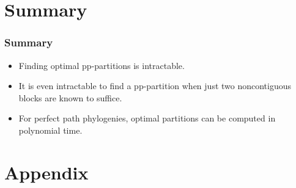 \documentclass{beamer}
\begin{document}
\section*{Summary}

\begin{frame}
  \frametitle<presentation>{Summary}

  \begin{itemize}
  \item
    Finding optimal pp-partitions is \alert{intractable}. 
  \item
    It is even intractable to find a pp-partition when \alert{just two 
      noncontiguous  blocks are known to suffice}.
  \item
    For perfect \alert{path} phylogenies, optimal partitions can be
    computed \alert{in polynomial time}.
  \end{itemize}
\end{frame}


\appendix

\section*{Appendix}
\end{document}
